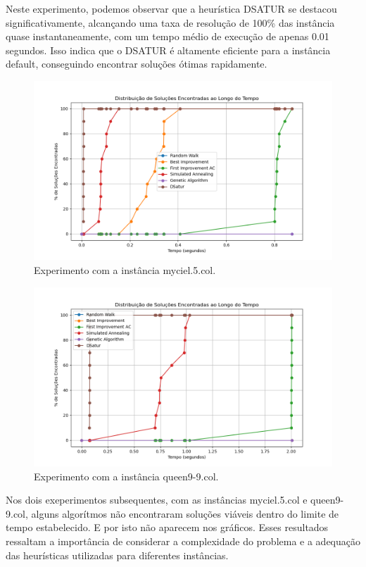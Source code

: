 \documentclass[12pt,a4paper]{article}
\begin{document}
Neste experimento, podemos observar que a heurística DSATUR se destacou significativamente, alcançando uma taxa de resolução de 100\% das instância quase instantaneamente, com um tempo médio de execução de apenas 0.01 segundos. Isso indica que o DSATUR é altamente eficiente para a instância default, conseguindo encontrar soluções ótimas rapidamente.


\begin{figure}[H]
    \centering
    \includegraphics[width=1\textwidth]{./img/output-myciel5.png}
    \caption{Experimento com a instância myciel.5.col.}
    \label{fig:experimento-myciel5}
\end{figure}

\begin{figure}[H]
    \centering
    \includegraphics[width=1\textwidth]{./img/output-queen9-9.png}
    \caption{Experimento com a instância queen9-9.col.}
    \label{fig:experimento-queen9-9}
\end{figure}

Nos dois exeperimentos subsequentes, com as instâncias myciel.5.col e queen9-9.col, alguns algorítmos não encontraram soluções viáveis dentro do limite de tempo estabelecido. E por isto não aparecem nos gráficos. Esses resultados ressaltam a importância de considerar a complexidade do problema e a adequação das heurísticas utilizadas para diferentes instâncias.
\end{document}
